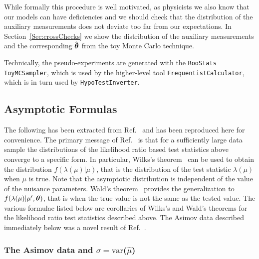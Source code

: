\documentclass{cernrep}
\def\vec#1{\ifmmode
\mathchoice{\mbox{\boldmath$\displaystyle\bf#1$}}
{\mbox{\boldmath$\textstyle\bf#1$}}
{\mbox{\boldmath$\scriptstyle\bf#1$}}
{\mbox{\boldmath$\scriptscriptstyle\bf#1$}}\else
{\mbox{\boldmath$\bf#1$}}\fi}
\begin{document}
While formally this procedure is well motivated, as physicists we also know that our models can have deficiencies and we should check that the distribution of the auxiliary measurements does not deviate too far from our expectations.  In Section~\ref{Sec:crossChecks} we show the distribution of the auxiliary measurements and the corresponding $\hat{\vec\theta}$ from the toy Monte Carlo technique.  

Technically, the pseudo-experiments are generated with the \texttt{RooStats} \texttt{ToyMCSampler}, which is used by the higher-level tool \texttt{FrequentistCalculator}, which is in turn used by \texttt{HypoTestInverter}.

 \subsection{Asymptotic Formulas }

The following has been extracted from Ref.~\cite{asimov} and has been reproduced here for convenience.  The primary message of Ref.~\cite{asimov} is that for a sufficiently large data sample the distributions of the likelihood ratio based test statistics above converge to a specific form.  In particular, Wilks's theorem~\cite{Wilks} can be used to obtain the distribution $f(\lambda(\mu)|\mu)$, that is the distribution of the test statistic $\lambda(\mu)$ when $\mu$ is true.  Note that the asymptotic distribution is independent of the value of the nuisance parameters. Wald's theorem~\cite{Wald} provides the generalization to $f(\lambda(\mu)|\mu',\vec\theta)$, that is when the true value is not the same as the tested value.  The various formulae listed below are corollaries of Wilks's and Wald's theorems for the likelihood ratio test statistics described above.  The Asimov data described immediately below was a novel result of Ref.~\cite{asimov}.

 \subsubsection{The Asimov data and  $\sigma=\textrm{var}$($\hat\mu$)}
  \label{S:Asimov}
\end{document}

